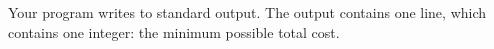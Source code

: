 Your program writes to standard output. The output contains one line, which contains
one integer: the minimum possible total cost.